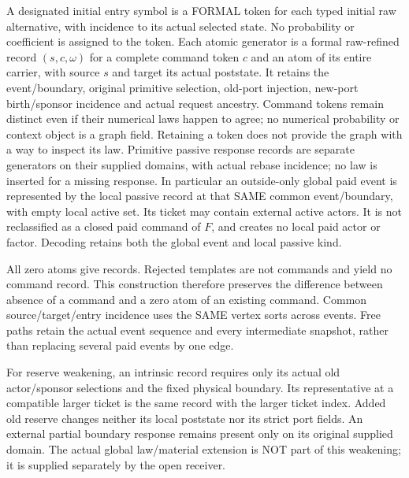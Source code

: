 \documentclass[11pt]{article}
\begin{document}
A designated initial entry symbol is a FORMAL token for each typed initial raw alternative, with incidence to its actual selected state. No probability or coefficient is assigned to the token. Each atomic generator is a formal raw-refined record $(s,c,\omega)$ for a complete command token $c$ and an atom of its entire carrier, with source $s$ and target its actual poststate. It retains the event/boundary, original primitive selection, old-port injection, new-port birth/sponsor incidence and actual request ancestry. Command tokens remain distinct even if their numerical laws happen to agree; no numerical probability or context object is a graph field. Retaining a token does not provide the graph with a way to inspect its law. Primitive passive response records are separate generators on their supplied domains, with actual rebase incidence; no law is inserted for a missing response. In particular an outside-only global paid event is represented by the local passive record at that SAME common event/boundary, with empty local active set. Its ticket may contain external active actors. It is not reclassified as a closed paid command of $F$, and creates no local paid actor or factor. Decoding retains both the global event and local passive kind.

All zero atoms give records. Rejected templates are not commands and yield no command record. This construction therefore preserves the difference between absence of a command and a zero atom of an existing command. Common source/target/entry incidence uses the SAME vertex sorts across events. Free paths retain the actual event sequence and every intermediate snapshot, rather than replacing several paid events by one edge.

For reserve weakening, an intrinsic record requires only its actual old actor/sponsor selections and the fixed physical boundary. Its representative at a compatible larger ticket is the same record with the larger ticket index. Added old reserve changes neither its local poststate nor its strict port fields. An external partial boundary response remains present only on its original supplied domain. The actual global law/material extension is NOT part of this weakening; it is supplied separately by the open receiver.
\end{document}
